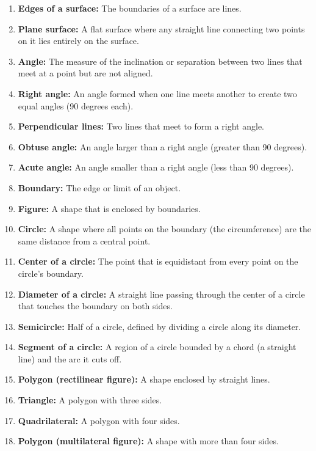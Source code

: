 \documentclass{report}
\begin{document}
\begin{itemize}
\begin{enumerate}
                \item \textbf{Edges of a surface:} The boundaries of a surface are lines.
                \item \textbf{Plane surface:} A flat surface where any straight line connecting two points on it lies entirely on the surface.
                \item \textbf{Angle:} The measure of the inclination or separation between two lines that meet at a point but are not aligned.
                \item \textbf{Right angle:} An angle formed when one line meets another to create two equal angles (90 degrees each).
                \item \textbf{Perpendicular lines:} Two lines that meet to form a right angle.
                \item \textbf{Obtuse angle:} An angle larger than a right angle (greater than 90 degrees).
                \item \textbf{Acute angle:} An angle smaller than a right angle (less than 90 degrees).
                \item \textbf{Boundary:} The edge or limit of an object.
                \item \textbf{Figure:} A shape that is enclosed by boundaries.
                \item \textbf{Circle:} A shape where all points on the boundary (the circumference) are the same distance from a central point.
                \item \textbf{Center of a circle:} The point that is equidistant from every point on the circle’s boundary.
                \item \textbf{Diameter of a circle:} A straight line passing through the center of a circle that touches the boundary on both sides.
                \item \textbf{Semicircle:} Half of a circle, defined by dividing a circle along its diameter.
                \item \textbf{Segment of a circle:} A region of a circle bounded by a chord (a straight line) and the arc it cuts off.
                \item \textbf{Polygon (rectilinear figure):} A shape enclosed by straight lines.
                \item \textbf{Triangle:} A polygon with three sides.
                \item \textbf{Quadrilateral:} A polygon with four sides.
                \item \textbf{Polygon (multilateral figure):} A shape with more than four sides.

\end{enumerate}
\end{itemize}
\end{document}
